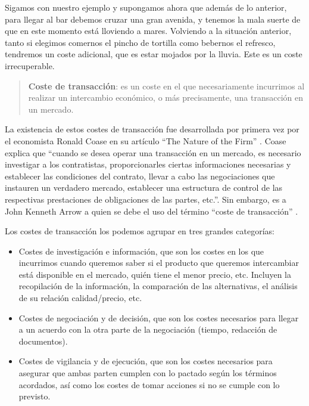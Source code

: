 \documentclass[
]{krantz}
\providecommand{\tightlist}{%
  \setlength{\itemsep}{0pt}\setlength{\parskip}{0pt}}
\begin{document}
Sigamos con nuestro ejemplo y supongamos ahora que además de lo anterior, para llegar al bar debemos cruzar una gran avenida, y tenemos la mala suerte de que en este momento está lloviendo a mares. Volviendo a la situación anterior, tanto si elegimos comernos el pincho de tortilla como bebernos el refresco, tendremos un coste adicional, que es estar mojados por la lluvia. Este es un coste irrecuperable.

\begin{quote}
\textbf{Coste de transacción}: es un coste en el que necesariamente incurrimos al realizar un intercambio económico, o más precisamente, una transacción en un mercado.
\end{quote}

La existencia de estos costes de transacción fue desarrollada por primera vez por el economista Ronald Coase en su artículo ``The Nature of the Firm'' \citep{coase1937}. Coase explica que ``cuando se desea operar una transacción en un mercado, es necesario investigar a los contratistas, proporcionarles ciertas informaciones necesarias y establecer las condiciones del contrato, llevar a cabo las negociaciones que instauren un verdadero mercado, establecer una estructura de control de las respectivas prestaciones de obligaciones de las partes, etc.''. Sin embargo, es a John Kenneth Arrow a quien se debe el uso del término ``coste de transacción'' \citep{arrow1969}.

Los costes de transacción los podemos agrupar en tres grandes categorías:

\begin{itemize}
\tightlist
\item
  Costes de investigación e información, que son los costes en los que incurrimos cuando queremos saber si el producto que queremos intercambiar está disponible en el mercado, quién tiene el menor precio, etc. Incluyen la recopilación de la información, la comparación de las alternativas, el análisis de su relación calidad/precio, etc.
\item
  Costes de negociación y de decisión, que son los costes necesarios para llegar a un acuerdo con la otra parte de la negociación (tiempo, redacción de documentos).
\item
  Costes de vigilancia y de ejecución, que son los costes necesarios para asegurar que ambas parten cumplen con lo pactado según los términos acordados, así como los costes de tomar acciones si no se cumple con lo previsto.
\end{itemize}
\end{document}
